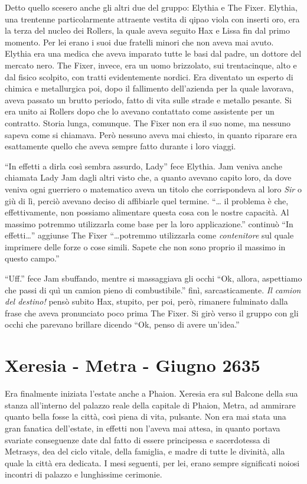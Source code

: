     Detto quello scesero anche gli altri due del gruppo: Elythia e The
    Fixer. Elythia, una trentenne particolarmente attraente vestita di
    qipao viola con inserti oro, era la terza del nucleo dei Rollers, la
    quale aveva seguito Hax e Lissa fin dal primo momento. Per lei erano i
    suoi due fratelli minori che non aveva mai avuto. Elythia era una
    medica che aveva imparato tutte le basi dal padre, un dottore del
    mercato nero. The Fixer, invece, era un uomo brizzolato, sui
    trentacinque, alto e dal fisico scolpito, con tratti evidentemente
    nordici. Era diventato un esperto di chimica e metallurgica poi, dopo
    il fallimento dell'azienda per la quale lavorava, aveva passato un
    brutto periodo, fatto di vita sulle strade e metallo pesante. Si era
    unito ai Rollers dopo che lo avevano contattato come assistente per un
    contratto. Storia lunga, comunque. The Fixer non era il suo nome, ma
    nessuno sapeva come si chiamava. Però nessuno aveva mai chiesto, in
    quanto riparare era esattamente quello che aveva sempre fatto durante
    i loro viaggi.

    ``In effetti a dirla così sembra assurdo, Lady'' fece Elythia. Jam
    veniva anche chiamata Lady Jam dagli altri visto che, a quanto avevano
    capito loro, da dove veniva ogni guerriero o matematico aveva un titolo
    che corrispondeva al loro \emph{Sir} o giù di lì, perciò avevano deciso
    di affibiarle quel termine. ``\dots{} il problema è che,
    effettivamente, non possiamo alimentare questa cosa con le nostre
    capacità. Al massimo potremmo utilizzarla come base per la loro
    applicazione.'' continuò ``In effetti\dots{}'' aggiunse The Fixer
    ``\dots{}potremmo utilizzarla come \emph{contenitore} sul quale
    imprimere delle forze o cose simili. Sapete che non sono proprio il
    massimo in questo campo.''

    ``Uff.'' fece Jam sbuffando, mentre si massaggiava gli occhi ``Ok,
    allora, aspettiamo che passi di quì un camion pieno di combustibile.''
    finì, sarcasticamente. \emph{Il camion del destino!} pensò subito Hax,
    stupito, per poi, però,
    rimanere fulminato dalla frase che aveva pronunciato poco prima The
    Fixer. Si girò verso il gruppo con gli occhi che parevano brillare
    dicendo ``Ok, penso di avere un'idea.''

    \section{Xeresia - Metra - Giugno 2635}
    Era finalmente iniziata l'estate anche a Phaion. Xeresia era sul
    Balcone della sua stanza all'interno del palazzo reale della capitale
    di Phaion, Metra, ad ammirare quanto bella fosse la città, così
    piena di vita, pulsante. Non era mai stata una gran fanatica
    dell'estate, in effetti non l'aveva mai attesa, in quanto portava
    svariate conseguenze date dal fatto di essere principessa e
    sacerdotessa di Metrasys, dea del ciclo vitale, della famiglia, e madre
    di tutte le divinità, alla quale la città era dedicata. I mesi
    seguenti, per lei, erano sempre significati noiosi incontri di palazzo
    e lunghissime cerimonie.

